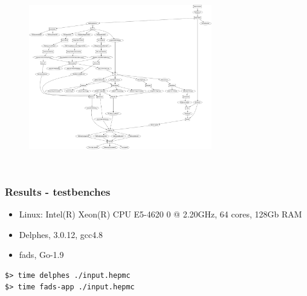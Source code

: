 \documentclass[9pt]{beamer}
\begin{document}
\begin{frame}[fragile]
\frametitle{}


\begin{figure}[h]
\begin{center}
\includegraphics[width=8cm,height=8cm]{_figs/fads-dflow.png}
\end{center}

\end{figure}


\end{frame}

\begin{frame}[fragile]
\frametitle{Results - testbenches}


\begin{itemize}
\item Linux: Intel(R) Xeon(R) CPU E5-4620 0 @ 2.20GHz, 64 cores, 128Gb RAM
\end{itemize}

\begin{itemize}
\item Delphes, 3.0.12, gcc4.8
\item fads, Go-1.9
\end{itemize}

	\begin{block}{}
\begin{verbatim}
$> time delphes ./input.hepmc
$> time fads-app ./input.hepmc
\end{verbatim}
	\end{block}{}


\end{frame}
\end{document}

